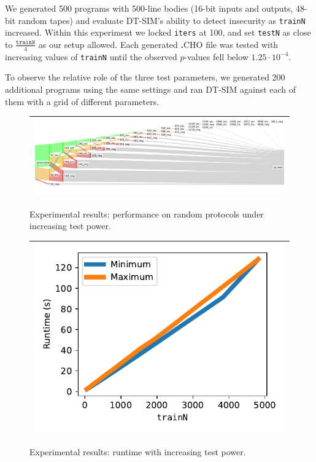 \documentclass[compsoc, conference, a4paper, 10pt, times]{IEEEtran}
\newcommand{\langname}{\textsc{\textbf{.}CHO}\xspace}
\newcommand{\toolname}{\textsc{DT-SIM}\xspace}
\begin{document}
We generated 500 programs with 500-line bodies (16-bit inputs and outputs, 48-bit random tapes)
and evaluate \toolname's ability to detect insecurity as \texttt{trainN} increased.
Within this experiment we locked \texttt{iters} at 100, and set \texttt{testN} as close to $\frac{\mathtt{trainN}}{4}$ as our setup allowed.
Each generated \langname file was tested with increasing values of \texttt{trainN} until the observed $p$-values fell below $1.25 \cdot 10^{-4}$.

To observe the relative role of the three test parameters, we generated 200 additional programs using the same settings
and ran \toolname against each of them with a grid of different parameters.


\begin{figure}
  \centering
  \newcommand{\gsize}{.9\textwidth}
\begin{tabular}{c}
    \hline\hline
    \includegraphics[width=\gsize]{graphs/medium2.old.pdf} \\
    \hline
    \hline
\end{tabular}
\caption{Experimental results: performance on random protocols under increasing test power.}
\label{fig:sankey}
\end{figure}

\begin{figure}
  \centering
  \newcommand{\gsize}{.38\textwidth}
\begin{tabular}{c}
    \hline\hline
    \includegraphics[width=\gsize]{graphs/asymptote_time.pdf} \\
    \hline
    \hline
\end{tabular}
\caption{Experimental results: runtime with increasing test power.}
\label{fig:linear-time}
\end{figure}
\end{document}
